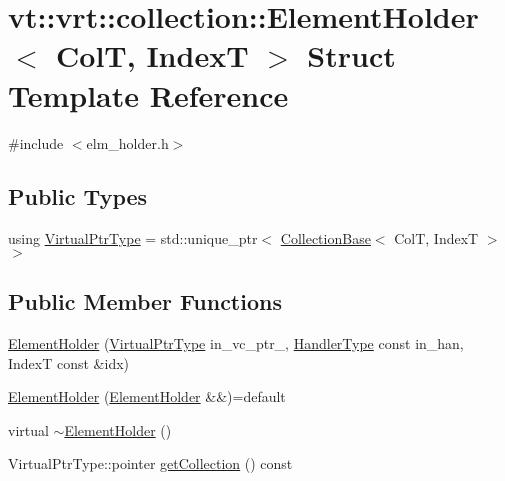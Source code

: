 \hypertarget{structvt_1_1vrt_1_1collection_1_1_element_holder}{}\section{vt\+:\+:vrt\+:\+:collection\+:\+:Element\+Holder$<$ ColT, IndexT $>$ Struct Template Reference}
\label{structvt_1_1vrt_1_1collection_1_1_element_holder}


{\ttfamily \#include $<$elm\+\_\+holder.\+h$>$}

\subsection*{Public Types}
\begin{DoxyCompactItemize}
\item 
using \hyperlink{structvt_1_1vrt_1_1collection_1_1_element_holder_afc12d1a71ec8f735f1b7fe12a067c8a6}{Virtual\+Ptr\+Type} = std\+::unique\+\_\+ptr$<$ \hyperlink{structvt_1_1vrt_1_1collection_1_1_collection_base}{Collection\+Base}$<$ ColT, IndexT $>$ $>$
\end{DoxyCompactItemize}
\subsection*{Public Member Functions}
\begin{DoxyCompactItemize}
\item 
\hyperlink{structvt_1_1vrt_1_1collection_1_1_element_holder_aff59f3b22c3f4c81daa68924bab65817}{Element\+Holder} (\hyperlink{structvt_1_1vrt_1_1collection_1_1_element_holder_afc12d1a71ec8f735f1b7fe12a067c8a6}{Virtual\+Ptr\+Type} in\+\_\+vc\+\_\+ptr\+\_\+, \hyperlink{namespacevt_af64846b57dfcaf104da3ef6967917573}{Handler\+Type} const in\+\_\+han, IndexT const \&idx)
\item 
\hyperlink{structvt_1_1vrt_1_1collection_1_1_element_holder_acc214e54954edc0d8112c59ea7e51c02}{Element\+Holder} (\hyperlink{structvt_1_1vrt_1_1collection_1_1_element_holder}{Element\+Holder} \&\&)=default
\item 
virtual \hyperlink{structvt_1_1vrt_1_1collection_1_1_element_holder_a04bbd1ceb1c94a4adaedeca1fc6d4acf}{$\sim$\+Element\+Holder} ()
\item 
Virtual\+Ptr\+Type\+::pointer \hyperlink{structvt_1_1vrt_1_1collection_1_1_element_holder_a737123e80d701335e9989bc300b0868b}{get\+Collection} () const
\end{DoxyCompactItemize}

